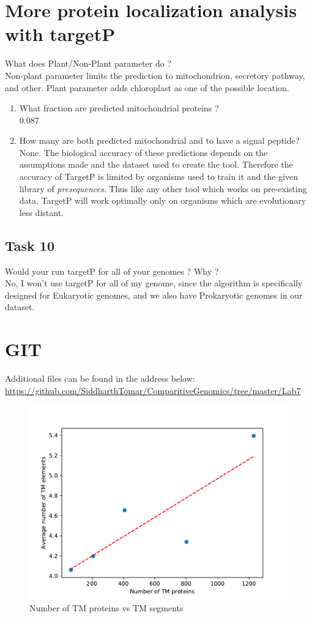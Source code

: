 \documentclass[a4paper,10pt]{article}
\begin{document}
\section*{More protein localization analysis with targetP}
\color{Gray}What does Plant/Non-Plant parameter do ?\\
\color{black}Non-plant parameter limits the prediction to mitochondrion, secretory pathway, and other. Plant parameter adds chloroplast as one of the possible location. 
\begin{enumerate}[label=(\alph*)]
\color{Gray}
\item What fraction are predicted mitochondrial proteins ?\\
\color{black}0.087
\color{Gray}
\item  How many are both predicted mitochondrial and to have a signal peptide?\\
\color{black}None. The biological accuracy of these predictions depends on the assumptions made and the dataset used to create the tool. Therefore the accuracy of TargetP is limited by organisms used to train it and the given library of \emph{presequences}. Thus like any other tool which works on pre-existing data, TargetP will work optimally only on organisms which are evolutionary less distant. 
\end{enumerate}

\subsection*{Task 10}
\color{Gray}Would your run targetP for all of your genomes ? Why ?\\
\color{black}No, I won't use targetP for all of my genome, since the algorithm is specifically designed for Eukaryotic genomes, and we also have Prokaryotic genomes in our dataset. 

\section*{GIT}
Additional files can be found in the address below:\\
\url{https://github.com/SiddharthTomar/ComparitiveGenomics/tree/master/Lab7}


\begin{figure}[h]
\centering
    \includegraphics[width=1\textwidth]{Plot}
    \caption{Number of TM proteins vs TM segments}
    \label{fig:se}
\end{figure}
\end{document}
